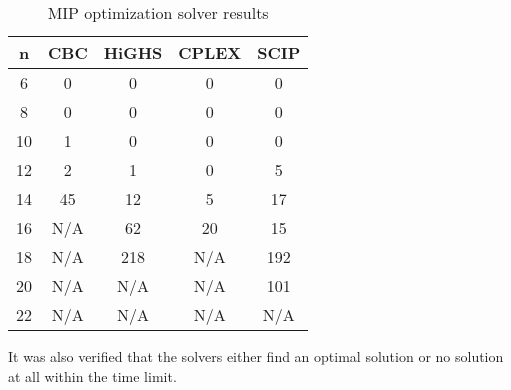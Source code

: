 \begin{table}[htbp]
\centering
\small
{%
\begin{tabular}{|c|c|c|c|c|}
\toprule
\textbf{n} & \textbf{CBC} &\textbf{HiGHS} & \textbf{CPLEX} & \textbf{SCIP} \\
\midrule
6 & 0 & 0 & 0 & 0 \\
8 & 0 & 0 & 0 & 0 \\
10 & 1 & 0 & 0 & 0 \\
12 & 2 & 1 & 0 & 5 \\
14 & 45 & 12 & 5 & 17\\
16 & N/A & 62 & 20 & 15\\
18 & N/A & 218 & N/A & 192\\
20 & N/A & N/A & N/A & 101\\
22 & N/A & N/A & N/A & N/A\\
\bottomrule
\end{tabular}
}
\caption{MIP optimization solver results}
\label{table:mip-results}
\end{table}

It was also verified that the solvers either find an optimal solution or no solution at all within the time limit.